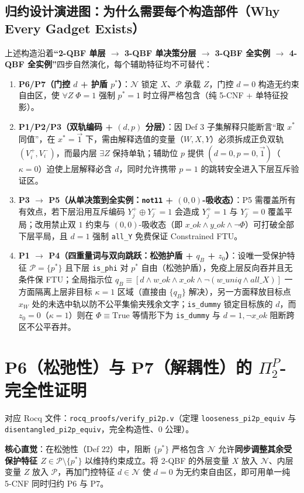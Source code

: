 \documentclass[11pt,a4paper]{article}
\newcommand{\N}{\mathcal{N}}
\newcommand{\Prot}{\mathcal{P}}
\newcommand{\code}[1]{\texttt{\small #1}}
\begin{document}
\subsection{归约设计演进图：为什么需要每个构造部件（Why Every Gadget Exists）}
上述构造沿着\textbf{“2-QBF 单层 $\to$ 3-QBF 单决策分层 $\to$ 3-QBF 全实例 $\to$ 4-QBF 全实例”}四步自然演化，每个辅助特征均不可替代：
\begin{enumerate}
  \item \textbf{P6/P7（门控 $d$ + 护盾 $p^*$）}：$\N$ 锁定 $X$、$\Prot$ 承载 $Z$，门控 $d=0$ 构造无约束自由区，使 $\forall Z\;\Phi=1$ 强制 $p^*=1$ 时立得严格包含（纯 5-CNF + 单特征投影）。
  \item \textbf{P1/P2/P3（双轨编码 + $(d,p)$ 分层）}：因 Def 3 子集解释只能断言“取 $x^*$ 同值”，在 $x^*=\vec{1}$ 下，需由解释选值的变量（$W,X,Y$）必须拆成正负双轨 $(V_i^+,V_i^-)$，而最内层 $\exists Z$ 保持单轨；辅助位 $p$ 提供 $(d=0,p=0,\vec{1})$（$\kappa=0$）迫使上层解释必含 $d$，同时允许携带 $p=1$ 的跳转安全进入下层互斥验证区。
  \item \textbf{P3 $\to$ P5（从单决策到全实例：\code{not11} + $(0,0)$-吸收态）}：P5 需覆盖所有有效点，若下层沿用互斥编码 $Y_j^+ \oplus Y_j^-=1$ 会造成 $Y_j^+=1$ 与 $Y_j^-=0$ 覆盖平局；改用禁止双 $1$ 约束与 $(0,0)$-吸收态（即 $x\_ok \land y\_ok \land \neg\Phi$）可打破全部下层平局，且 $d=1$ 强制 \code{all\_Y} 免费保证 Constrained FTU。
  \item \textbf{P1 $\to$ P4（四重量词与双向跳跃：松弛护盾 + $q_B$ + $z_0$）}：设唯一受保护特征 $\Prot=\{p^*\}$ 且下层 \code{is\_phi} 对 $p^*$ 自由（松弛护盾），免疫上层反向吞并且无条件保 FTU；全局指示位 $q_B \equiv [d \land w\_ok \land x\_ok \land \neg(w\_uniq \land all\_X)]$ 一方面隔离上层非目标 $\kappa=1$ 区域（直接由 $\{q_B\}$ 解决），另一方面释放目标点 $x_W$ 处的未选中轨以防不公平集偷夹残余文字；\code{is\_dummy} 锁定目标族的 $d$，而 $z_0=0$（$\kappa=1$）则在 $\Phi \equiv \mathrm{True}$ 等情形下为 \code{is\_dummy} 与 $d=1, \neg x\_ok$ 阻断跨区不公平吞并。
\end{enumerate}

\section{P6（松弛性）与 P7（解耦性）的 \texorpdfstring{$\Pi_2^P$}{Pi\_2\^{}P}-完全性证明}
对应 Rocq 文件：\code{rocq\_proofs/verify\_pi2p.v}（定理 \code{looseness\_pi2p\_equiv} 与 \code{disentangled\_pi2p\_equiv}，完全构造性、0 公理）。

\textbf{核心直觉}：在松弛性（Def 22）中，阻断 $\{p^*\}$ 严格包含 $\N$ 允许\textbf{同步调整其余受保护特征 $Z \in \Prot\setminus\{p^*\}$} 以维持约束成立。将 2-QBF 的外层变量 $X$ 放入 $\N$、内层变量 $Z$ 放入 $\Prot$，再加门控特征 $d \in \N$ 使 $d=0$ 为无约束自由区，即可用单一纯 5-CNF 同时归约 P6 与 P7。
\end{document}

